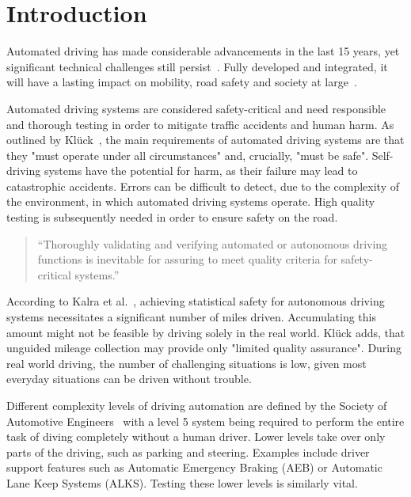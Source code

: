 \chapter{Introduction}
Automated driving has made considerable advancements in the last 15 years, yet significant technical challenges still persist~\cite{ayoub_manual_2019}.
Fully developed and integrated, it will have a lasting impact on mobility, road safety and society at large~\cite{milakis_policy_2017}.

Automated driving systems are considered safety-critical and need responsible and thorough testing in order to mitigate traffic accidents and human harm. As outlined by Klück~\cite{kluck_search-based_2022}, the main requirements of automated driving systems are that they "must operate under all circumstances" and, crucially, "must be safe". Self-driving systems have the potential for harm, as their failure may lead to catastrophic accidents. Errors can be difficult to detect, due to the complexity of the environment, in which automated driving systems operate. High quality testing is subsequently needed in order to ensure safety on the road. 

\begin{quote}
	\begin{em}
		\enquote{Thoroughly validating and verifying automated or autonomous driving functions is inevitable for assuring to meet quality criteria for safety-critical systems.}~\cite{felbinger_comparing_2019}
	\end{em}
\end{quote}

According to Kalra et al.~\cite{kalra_driving_2016}, achieving statistical safety for autonomous driving systems necessitates a significant number of miles driven. Accumulating this amount might not be feasible by driving solely in the real world. Klück \cite{kluck_search-based_2022} adds, that unguided mileage collection may provide only "limited quality assurance". During real world driving, the number of challenging situations is low, given most everyday situations can be driven without trouble.

Different complexity levels of driving automation are defined by the Society of Automotive Engineers~\cite{saej3016} with a level 5 system being required to perform the entire task of diving completely without a human driver. Lower levels take over only parts of the driving, such as parking and steering. Examples include driver support features such as Automatic Emergency Braking (AEB) or Automatic Lane Keep Systems (ALKS). Testing these lower levels is similarly vital.

